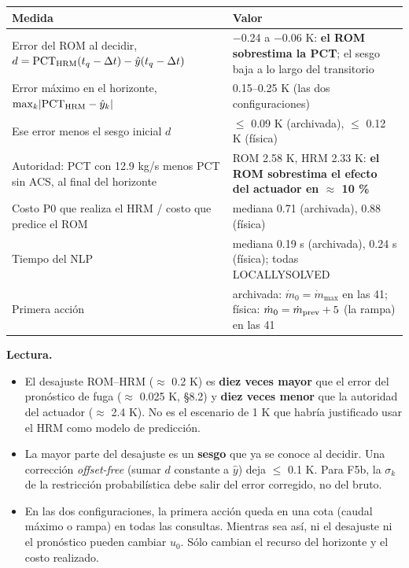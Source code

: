 \documentclass[11pt,a4paper]{article}
\newcommand{\codeus}{\textunderscore\allowbreak}
\newcommand{\code}[1]{{\small\ttfamily\let\_\codeus #1}}
\begin{document}
{\small
\begin{xltabular}{\linewidth}{@{}YY@{}}
\toprule
\textbf{Medida} & \textbf{Valor} \\
\midrule
\endhead
Error del ROM al decidir, $d=\mathrm{PCT}_{\rm HRM}(t_q-\Delta t)-\hat y(t_q-\Delta t)$ & $-$0.24 a $-$0.06 K: \textbf{el ROM sobrestima la PCT}; el sesgo baja a lo largo del transitorio \\
Error máximo en el horizonte, $\max_k\lvert\mathrm{PCT}_{\rm HRM}-\hat y_k\rvert$ & 0.15–0.25 K (las dos configuraciones) \\
Ese error menos el sesgo inicial $d$ & $\le$ 0.09 K (archivada), $\le$ 0.12 K (física) \\
Autoridad: PCT con 12.9 kg/s menos PCT sin ACS, al final del horizonte & ROM 2.58 K, HRM 2.33 K: \textbf{el ROM sobrestima el efecto del actuador en $\approx$ 10 \%} \\
Costo P0 que realiza el HRM / costo que predice el ROM & mediana 0.71 (archivada), 0.88 (física) \\
Tiempo del NLP & mediana 0.19 s (archivada), 0.24 s (física); todas \code{LOCALLY\_SOLVED} \\
Primera acción & archivada: $\dot m_0=\dot m_{\max}$ en las 41; física: $\dot m_0=\dot m_{\rm prev}+5$ (la rampa) en las 41 \\
\bottomrule
\end{xltabular}}

\textbf{Lectura.}

\begin{itemize}
\item El desajuste ROM–HRM ($\approx$ 0.2 K) es \textbf{diez veces mayor} que el error del pronóstico de fuga ($\approx$ 0.025 K, \S{}8.2) y \textbf{diez veces menor} que la autoridad del actuador ($\approx$ 2.4 K). No es el escenario de 1 K que habría justificado usar el HRM como modelo de predicción.
\item La mayor parte del desajuste es un \textbf{sesgo} que ya se conoce al decidir. Una corrección \emph{offset-free} (sumar $d$ constante a $\hat y$) deja $\le$ 0.1 K. Para F5b, la $\sigma_k$ de la restricción probabilística debe salir del error corregido, no del bruto.
\item En las dos configuraciones, la primera acción queda en una cota (caudal máximo o rampa) en todas las consultas. Mientras sea así, ni el desajuste ni el pronóstico pueden cambiar $u_0$. Sólo cambian el recurso del horizonte y el costo realizado.
\end{itemize}
\end{document}
